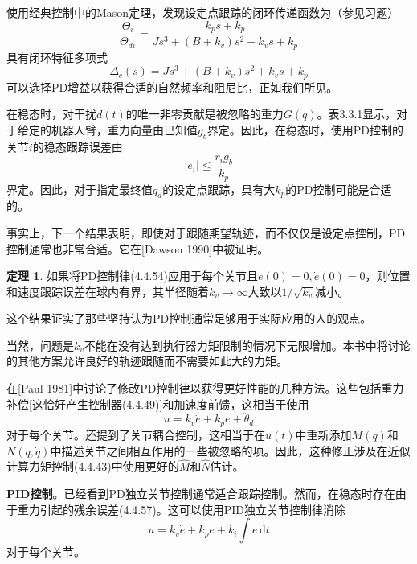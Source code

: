 \documentclass[UTF8]{ctexart}
\theoremstyle{definition}
\newtheorem{theorem}{定理}[section]
\newcommand{\dd}{\mathrm{d}}
\begin{document}
使用经典控制中的Mason定理，发现设定点跟踪的闭环传递函数为（参见习题）
\begin{equation}
    \frac{\Theta_i}{\Theta_{di}} = \frac{k_ps + k_p}{Js^3 + (B + k_v)s^2 + k_vs + k_p}
\end{equation}
具有闭环特征多项式
\begin{equation}
    \Delta_c(s) = Js^3 + (B + k_v)s^2 + k_vs + k_p
\end{equation}
可以选择PD增益以获得合适的自然频率和阻尼比，正如我们所见。

在稳态时，对干扰$d(t)$的唯一非零贡献是被忽略的重力$G(q)$。表3.3.1显示，对于给定的机器人臂，重力向量由已知值$g_b$界定。因此，在稳态时，使用PD控制的关节$i$的稳态跟踪误差由
\begin{equation}
    |e_i| \leq \frac{r_i g_b}{k_p}
\end{equation}
界定。因此，对于指定最终值$q_d$的设定点跟踪，具有大$k_p$的PD控制可能是合适的。

事实上，下一个结果表明，即使对于跟随期望轨迹，而不仅仅是设定点控制，PD控制通常也非常合适。它在[Dawson 1990]中被证明。

\begin{theorem}
如果将PD控制律(4.4.54)应用于每个关节且$e(0) = 0, \dot{e}(0) = 0$，则位置和速度跟踪误差在球内有界，其半径随着$k_v \to \infty$大致以$1/\sqrt{k_v}$减小。
\end{theorem}

这个结果证实了那些坚持认为PD控制通常足够用于实际应用的人的观点。

当然，问题是$k_v$不能在没有达到执行器力矩限制的情况下无限增加。本书中将讨论的其他方案允许良好的轨迹跟随而不需要如此大的力矩。

在[Paul 1981]中讨论了修改PD控制律以获得更好性能的几种方法。这些包括重力补偿[这恰好产生控制器(4.4.49)]和加速度前馈，这相当于使用
\begin{equation}
    u = k_v\dot{e} + k_pe + \ddot{\theta}_d
\end{equation}
对于每个关节。还提到了关节耦合控制，这相当于在$u(t)$中重新添加$M(q)$和$N(q, \dot{q})$中描述关节之间相互作用的一些被忽略的项。因此，这种修正涉及在近似计算力矩控制(4.4.43)中使用更好的$\hat{M}$和$\hat{N}$估计。

\textbf{PID控制}。已经看到PD独立关节控制通常适合跟踪控制。然而，在稳态时存在由于重力引起的残余误差(4.4.57)。这可以使用PID独立关节控制律消除
\begin{equation}
    u = k_v\dot{e} + k_pe + k_i\int e\,\dd t
\end{equation}
对于每个关节。
\end{document}
